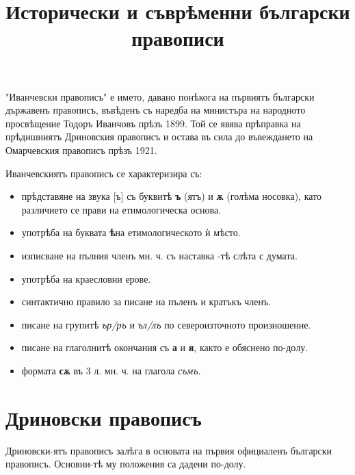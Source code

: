 \documentclass{article}
\begin{document}
	\title{Исторически и съврѣменни български правописи}
	\maketitle

	"Иванчевски правописъ" е името, давано понѣкога на първиятъ български държавенъ  правописъ, 
	въвѣденъ съ наредба на министъра на народното просвѣщение Тодоръ Иванчовъ прѣзъ 1899.
	Той се явява прѣправка на прѣдишниятъ Дриновския правописъ и остава въ сила до въвеждането на Омарчевския правописъ прѣзъ 1921. 
	
	Иванчевскиятъ правописъ се характеризира съ:
	\begin{itemize}
		\item прѣдставяне на звука [ъ] съ буквитѣ \textbf{ъ}  (ятъ) и \textbf{ѫ} (голѣма носовка), като различието се прави на етимологическа основа. 
		\item употрѣба на буквата \textbf{ѣ}на етимологическото ѝ мѣсто.
		\item изписване на пълния членъ мн. ч. съ наставка -тѣ слѣта с думата.
		\item употрѣба на краесловни ерове.
		\item синтактично правило за писане на пъленъ и кратъкъ членъ.
		\item писане на групитѣ \textit{ър/ръ} и \textit{ъл/лъ} по североизточното произношение.
		\item писане на глаголнитѣ окончания съ \textbf{а} и \textbf{я}, както е обяснено по-долу.
		\item формата \textbf{сѫ} въ 3 л. мн. ч. на глагола \textit{съмъ}.
	\end{itemize}
	
	\section{Дриновски правописъ}\label{sec:drinov}
	
		Дриновски-ятъ правописъ залѣга в основата на първия официаленъ български правописъ.  
		Основни-тѣ му положения са дадени по-долу.  
	
\end{document}

